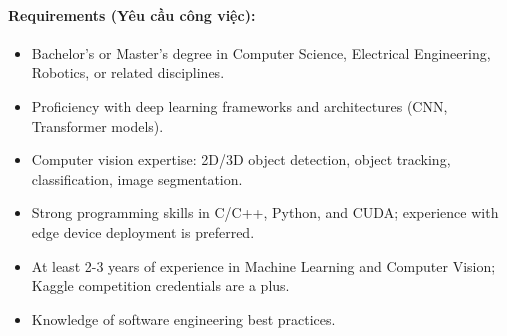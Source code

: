 \paragraph{Requirements (Yêu cầu công việc):}
\begin{itemize}
    \item Bachelor's or Master's degree in Computer Science, Electrical Engineering, Robotics, or related disciplines.
    \item Proficiency with deep learning frameworks and architectures (CNN, Transformer models).
    \item Computer vision expertise: 2D/3D object detection, object tracking, classification, image segmentation.
    \item Strong programming skills in C/C++, Python, and CUDA; experience with edge device deployment is preferred.
    \item At least 2-3 years of experience in Machine Learning and Computer Vision; Kaggle competition credentials are a plus.
    \item Knowledge of software engineering best practices.
\end{itemize}
